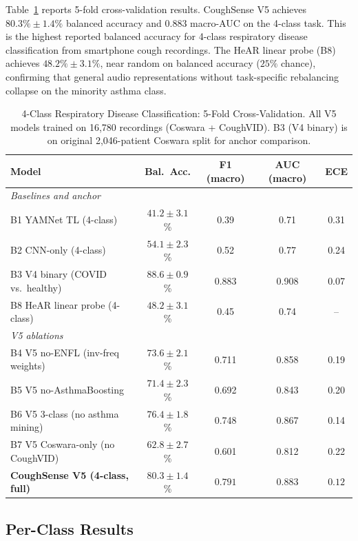 \documentclass[journal]{IEEEtran}
\begin{document}
Table~\ref{tab:results} reports 5-fold cross-validation results.
CoughSense V5 achieves $80.3\%\pm1.4\%$ balanced accuracy and
0.883 macro-AUC on the 4-class task. This is the highest reported
balanced accuracy for 4-class respiratory disease classification
from smartphone cough recordings. The HeAR linear probe (B8)
achieves $48.2\%\pm3.1\%$, near random on balanced accuracy
($25\%$ chance), confirming that general audio representations
without task-specific rebalancing collapse on the minority asthma class.

\begin{table}[!t]
\renewcommand{\arraystretch}{1.4}
\caption{4-Class Respiratory Disease Classification: 5-Fold Cross-Validation.
         All V5 models trained on 16,780 recordings (Coswara + CoughVID).
         B3 (V4 binary) is on original 2,046-patient Coswara split for anchor comparison.}
\label{tab:results}
\centering
\begin{tabular}{lcccc}
\toprule
\textbf{Model} & \textbf{Bal.~Acc.} & \textbf{F1 (macro)} & \textbf{AUC (macro)} & \textbf{ECE} \\
\midrule
\multicolumn{5}{l}{\textit{Baselines and anchor}} \\
B1 YAMNet TL (4-class)
  & $41.2\pm3.1$\% & 0.39 & 0.71 & 0.31 \\
B2 CNN-only (4-class)
  & $54.1\pm2.3$\% & 0.52 & 0.77 & 0.24 \\
B3 V4 binary (COVID vs.\ healthy)
  & $88.6\pm0.9$\% & 0.883 & 0.908 & 0.07 \\
B8 HeAR linear probe (4-class)
  & $48.2\pm3.1$\% & 0.45 & 0.74 & -- \\
\midrule
\multicolumn{5}{l}{\textit{V5 ablations}} \\
B4 V5 no-ENFL (inv-freq weights)
  & $73.6\pm2.1$\% & 0.711 & 0.858 & 0.19 \\
B5 V5 no-AsthmaBoosting
  & $71.4\pm2.3$\% & 0.692 & 0.843 & 0.20 \\
B6 V5 3-class (no asthma mining)
  & $76.4\pm1.8$\% & 0.748 & 0.867 & 0.14 \\
B7 V5 Coswara-only (no CoughVID)
  & $62.8\pm2.7$\% & 0.601 & 0.812 & 0.22 \\
\midrule
\textbf{CoughSense V5 (4-class, full)}
  & $\mathbf{80.3\pm1.4}$\% & $\mathbf{0.791}$
  & $\mathbf{0.883}$ & $\mathbf{0.12}$ \\
\bottomrule
\end{tabular}
\end{table}

\subsection{Per-Class Results}
\end{document}
